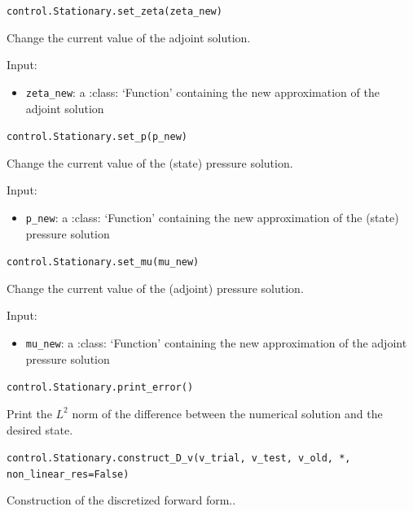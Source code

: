\documentclass[letterpaper,10pt,english]{sphinxmanual}
\begin{document}
\vspace{3ex}

\texttt{control.Stationary.set{\_}zeta(zeta{\_}new)}

Change the current value of the adjoint solution.

Input:
\begin{itemize}
\item \texttt{zeta{\_}new}: a :class: `Function' containing the new approximation
            of the adjoint solution
\end{itemize}

\vspace{3ex}

\texttt{control.Stationary.set{\_}p(p{\_}new)}

Change the current value of the (state) pressure solution.

Input:
\begin{itemize}
\item \texttt{p{\_}new}: a :class: `Function' containing the new approximation
            of the (state) pressure solution
\end{itemize}

\vspace{3ex}

\texttt{control.Stationary.set{\_}mu(mu{\_}new)}

Change the current value of the (adjoint) pressure solution.

Input:
\begin{itemize}
\item \texttt{mu{\_}new}: a :class: `Function' containing the new approximation
            of the adjoint pressure solution
\end{itemize}

\vspace{3ex}

\texttt{control.Stationary.print{\_}error()}

Print the $L^2$ norm of the difference between the numerical solution and the desired state.

\vspace{3ex}

\texttt{control.Stationary.construct{\_}D{\_}v(v{\_}trial, v{\_}test, v{\_}old, *, non{\_}linear{\_}res=False)}

Construction of the discretized forward form..
\end{document}
